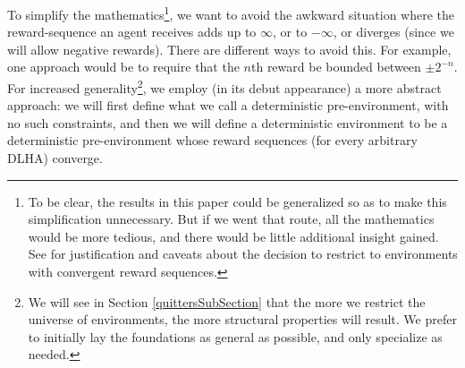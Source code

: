 \documentclass[twoside,11pt]{article}
\begin{document}
To simplify the mathematics\footnote{To be clear, the results in this paper
could be generalized so as to make this simplification unnecessary.
But if we went that route, all the
mathematics would be more tedious, and there would be little additional
insight gained. See \citet{hutter2007} for
justification and caveats about the decision to restrict to environments
with convergent reward sequences.}, we want to avoid the awkward situation where
the reward-sequence an agent receives adds up to $\infty$, or to $-\infty$,
or diverges (since we will allow negative rewards). There are different ways
to avoid this. For example, one
approach would be to require that the $n$th reward be bounded
between $\pm 2^{-n}$. For increased
generality\footnote{We will see in Section \ref{quittersSubSection} that the
more we restrict
the universe of environments, the more structural properties will result. We prefer
to initially lay the foundations as general as possible, and only specialize as
needed.},
we employ (in its debut appearance) a more
abstract approach: we will first define what we call a deterministic pre-environment,
with no such constraints, and then we will define a deterministic environment to be
a deterministic pre-environment whose reward sequences (for every arbitrary DLHA) converge.
\end{document}
